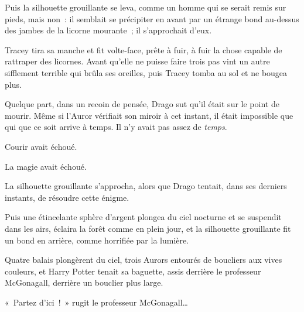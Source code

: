 Puis la silhouette grouillante se leva, comme un homme qui se serait remis sur pieds, mais non~: il semblait se précipiter en avant par un étrange bond au-dessus des jambes de la licorne mourante~; il s'approchait d'eux.

Tracey tira sa manche et fit volte-face, prête à fuir, à fuir la chose capable de rattraper des licornes. Avant qu'elle ne puisse faire trois pas vint un autre sifflement terrible qui brûla ses oreilles, puis Tracey tomba au sol et ne bougea plus.

Quelque part, dans un recoin de pensée, Drago sut qu'il était sur le point de mourir. Même si l'Auror vérifiait son miroir à cet instant, il était impossible que qui que ce soit arrive à temps. Il n'y avait pas assez de \emph{temps}.

Courir avait échoué.

La magie avait échoué.

La silhouette grouillante s'approcha, alors que Drago tentait, dans ses derniers instants, de résoudre cette énigme.

Puis une étincelante sphère d'argent plongea du ciel nocturne et se suspendit dans les airs, éclaira la forêt comme en plein jour, et la silhouette grouillante fit un bond en arrière, comme horrifiée par la lumière.

Quatre balais plongèrent du ciel, trois Aurors entourés de boucliers aux vives couleurs, et Harry Potter tenait sa baguette, assis derrière le professeur McGonagall, derrière un bouclier plus large.

«~Partez d'ici~!~» rugit le professeur McGonagall…

